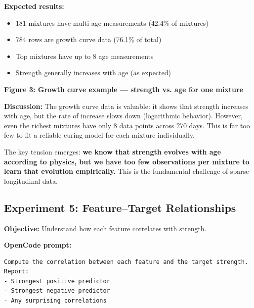 \documentclass[11pt]{article}
\begin{document}
\textbf{Expected results:}
\begin{itemize}[nosep]
  \item 181 mixtures have multi-age measurements (42.4\% of mixtures)
  \item 784 rows are growth curve data (76.1\% of total)
  \item Top mixtures have up to 8 age measurements
  \item Strength generally increases with age (as expected)
\end{itemize}

\begin{center}
\end{center}
\begin{center}
\textbf{Figure 3: Growth curve example --- strength vs. age for one mixture}
\end{center}

\textbf{Discussion:}
The growth curve data is valuable: it shows that strength increases with age, but the rate of increase slows down (logarithmic behavior).  However, even the richest mixtures have only 8 data points across 270 days.  This is far too few to fit a reliable curing model for each mixture individually.

The key tension emerges: \textbf{we know that strength evolves with age according to physics, but we have too few observations per mixture to learn that evolution empirically.}  This is the fundamental challenge of sparse longitudinal data.

\subsection{Experiment 5: Feature--Target Relationships}
\label{sec:experiment-5}

\textbf{Objective:} Understand how each feature correlates with strength.

\textbf{OpenCode prompt:}
\begin{lstlisting}[style=term]
Compute the correlation between each feature and the target strength.
Report:
- Strongest positive predictor
- Strongest negative predictor
- Any surprising correlations
\end{lstlisting}
\end{document}
